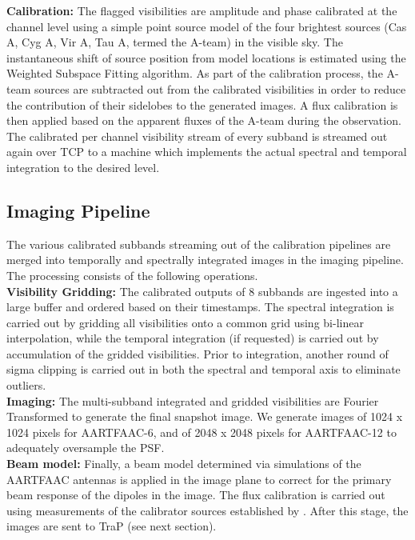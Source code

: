 \documentclass{ws-jai}
\begin{document}
\noindent  \textbf {Calibration:}  The  flagged visibilities  are amplitude  and
phase calibrated at the  channel level using a simple point  source model of the
four brightest sources  (Cas A, Cyg A, Vir  A, Tau A, termed the  A-team) in the
visible sky. The instantaneous shift of  source position from model locations is
estimated  using  the  Weighted Subspace  Fitting  \citep  {viberg1991detection}
algorithm. As part of the calibration process, the A-team sources are subtracted
out from  the calibrated  visibilities in  order to  reduce the  contribution of
their sidelobes  to the generated  images.  A  flux calibration is  then applied
based  on  the apparent  fluxes  of  the  A-team  during the  observation.   The
calibrated per channel visibility stream of  every subband is streamed out again
over  TCP  to a  machine  which  implements  the  actual spectral  and  temporal
integration to the desired level.\\

\subsection{Imaging Pipeline} 
The various calibrated  subbands streaming out of the  calibration pipelines are
merged  into  temporally  and  spectrally   integrated  images  in  the  imaging
pipeline. The processing consists of the following operations.\\

\noindent \textbf  {Visibility Gridding:} The  calibrated outputs of  8 subbands
are ingested  into a large  buffer and ordered  based on their  timestamps.  The
spectral integration is  carried out by gridding all visibilities  onto a common
grid  using   bi-linear  interpolation,  while  the   temporal  integration  (if
requested) is carried out by accumulation of the gridded visibilities.  Prior to
integration, another round of sigma clipping is carried out in both the spectral
and temporal axis to eliminate outliers.\\

\noindent   \textbf  {Imaging:}   The  multi-subband   integrated  and   gridded
visibilities are  Fourier Transformed to  generate the final snapshot  image. We
generate images of 1024 x 1024 pixels  for AARTFAAC-6, and of 2048 x 2048 pixels
for AARTFAAC-12 to adequately oversample the PSF. \\

\noindent \textbf {Beam model:} Finally, a beam model determined via simulations
of  the AARTFAAC  antennas is  applied in  the image  plane to  correct for  the
primary beam  response of  the dipoles  in the image.   The flux  calibration is
carried out using  measurements of the calibrator sources  established by \citet
{scaife2012broad}.  After  this stage,  the images  are sent  to TraP  (see next
section).
\end{document}
